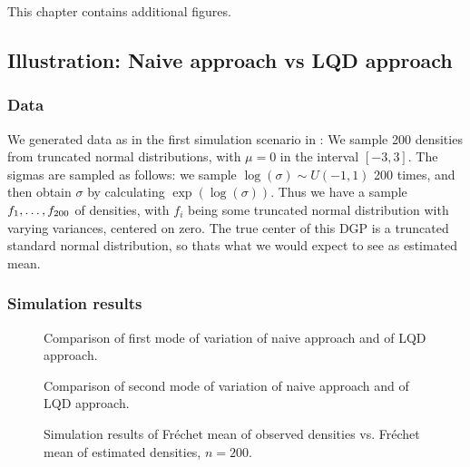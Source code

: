 This chapter contains additional figures.

\subsection{Illustration: Naive approach vs LQD approach}
\label{sec:illustration_lqd}

\subsubsection{Data}
\label{sec:dgp_descriptives}
We generated data as in the first simulation scenario in \textcite{PetersenMüller2016}:
We sample 200 densities from truncated normal distributions, with $\mu = 0$ in the
interval $[-3,3]$. The sigmas are sampled as follows: we sample $\log(\sigma) \sim U(-1,1)$
200 times, and then obtain $\sigma$ by calculating $\exp(\log(\sigma))$. Thus we have a sample
$f_1, \nobreak \dots, \nobreak f_{200}$ of densities, with $f_i$ being some truncated
normal distribution with varying variances, centered on zero. The true center of this DGP
is a truncated standard normal distribution, so thats what we would expect to see as
estimated mean.

\subsubsection{Simulation results}
\label{sec:illustration_simulation}

\begin{figure}[h]
    \centering
    \resizebox{0.9\textwidth}{!}{}
    \caption[Comparison: first mode of variation]{Comparison of first mode of variation
    of naive approach and of LQD approach.}
    \label{fig:1st_modes}
\end{figure}

\begin{figure}[h]
    \centering
    \resizebox{0.9\textwidth}{!}{}
    \caption[Comparison: second mode of variation]{Comparison of second mode of variation
    of naive approach and of LQD approach.}
    \label{fig:2nd_modes}
\end{figure}

\begin{figure}[h]
    \centering
    
    \caption[Simulation results: observed vs estimated densities --- Fréchet mean]{Simulation
    results of Fréchet mean of observed densities vs. Fréchet mean of estimated densities,
    $n=200$.}
    \label{fig:sim_f_denstimation}
\end{figure}

